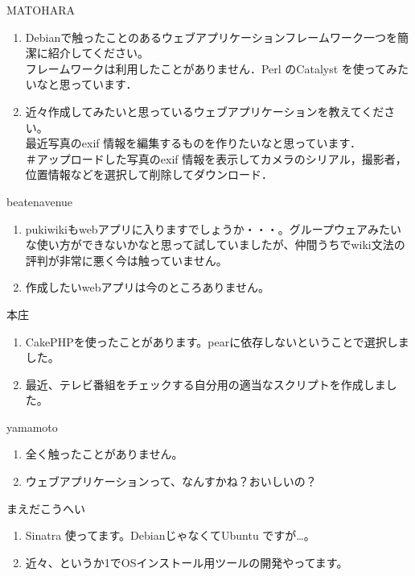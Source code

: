 \begin{prework}{ MATOHARA }
\begin{enumerate}
\item Debianで触ったことのあるウェブアプリケーションフレームワーク一つを簡潔に紹介してください。 \\
フレームワークは利用したことがありません．Perl のCatalyst を使ってみたいなと思っています．
\item 近々作成してみたいと思っているウェブアプリケーションを教えてください。\\
最近写真のexif 情報を編集するものを作りたいなと思っています．\\
＃アップロードした写真のexif 情報を表示してカメラのシリアル，撮影者，位置情報などを選択して削除してダウンロード．
\end{enumerate}
\end{prework}

\begin{prework}{ beatenavenue }
\begin{enumerate}
\item pukiwikiもwebアプリに入りますでしょうか・・・。グループウェアみたいな使い方ができないかなと思って試していましたが、仲間うちでwiki文法の評判が非常に悪く今は触っていません。
\item 作成したいwebアプリは今のところありません。
\end{enumerate}
\end{prework}

\begin{prework}{ 本庄 }
\begin{enumerate}
\item CakePHPを使ったことがあります。pearに依存しないということで選択しました。
\item 最近、テレビ番組をチェックする自分用の適当なスクリプトを作成しました。
\end{enumerate}
\end{prework}

\begin{prework}{ yamamoto }
\begin{enumerate}
\item 全く触ったことがありません。
\item ウェブアプリケーションって、なんすかね？おいしいの？
\end{enumerate}
\end{prework}

\begin{prework}{ まえだこうへい }
\begin{enumerate}
\item Sinatra 使ってます。DebianじゃなくてUbuntu ですが…。
\item 近々、というか1でOSインストール用ツールの開発やってます。
\end{enumerate}
\end{prework}


